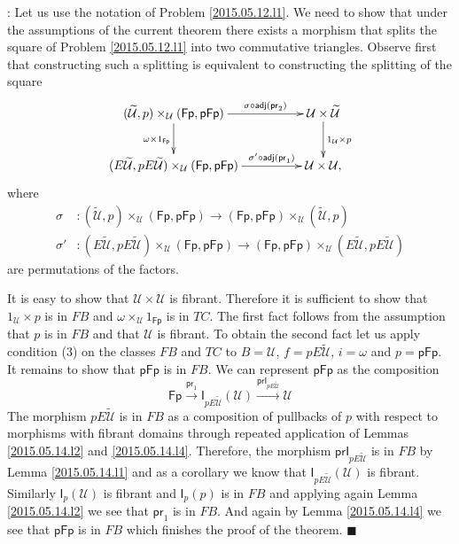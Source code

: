 \documentclass[12pt]{article}
\numberwithin{equation}{section}
\newenvironment{myproof}{{\bf Proof}:}{$\blacksquare$ \vskip 5mm }
\newcommand{\sr}{\rightarrow}
\newcommand{\wt}{\widetilde}
\newcommand{\id}{1}            %
\newcommand{\U}{\mathcal{U}}
\newcommand{\I}{\mathsf{I}}
\newcommand{\Fp}{\mathsf{Fp}}
\newcommand{\pFp}{\mathsf{pFp}}
\newcommand{\pr}{\mathsf{pr}}
\newcommand{\prI}{\mathsf{prI}}
\newcommand{\adj}{\mathsf{adj}}
\begin{document}
\begin{myproof}
Let us use the notation of Problem \ref{2015.05.12.l1}. We need to show that
under the assumptions of the current theorem there exists a morphism that
splits the square of Problem \ref{2015.05.12.l1} into two commutative
triangles. Observe first that constructing such a splitting is equivalent to
constructing the splitting of the square
%
$$
\begin{xy}
          \xymatrix@C=4pc{ (\wt{\U},p)\times_\U (\Fp,\pFp) \ar[r]^-{\sigma\circ
              \adj(\pr_2)} \ar[d]_{\omega \times \id_{\Fp}} & \U\times\wt{\U}
            \ar[d]^{\id_\U\times p}\\ (E\wt{\U},pE\wt{\U})\times_\U (\Fp,\pFp)
            \ar[r]^-{\sigma'\circ \adj(\pr_1)} & \U\times \U, }
\end{xy}
$$
%
where
%
\begin{align*}
  \sigma & :(\wt{\U},p)\times_\U (\Fp,\pFp)\sr (\Fp,\pFp)\times_\U (\wt{\U},p) \\
  \sigma'& :(E\wt{\U},pE\wt{\U})\times_\U (\Fp,\pFp) \sr (\Fp,\pFp) \times_\U (E\wt{\U},pE\wt{\U})
\end{align*}
%
are permutations of the factors.

It is easy to show that $\U\times \U$ is fibrant. Therefore it is sufficient to
show that $\id_\U\times p$ is in $FB$ and $\omega\times_\U \id_{\Fp}$ is in
$TC$. The first fact follows from the assumption that $p$ is in $FB$ and that
$\U$ is fibrant. To obtain the second fact let us apply condition (3) on the
classes $FB$ and $TC$ to $B=\U$, $f=pE\wt{\U}$, $i=\omega$ and $p=\pFp$.  It
remains to show that $\pFp$ is in $FB$. We can represent $\pFp$ as the
composition
%
$$\Fp\stackrel{\pr_1}{\sr} \I_{pE\wt{\U}}(\U) \stackrel{\prI_{pE\wt{\U}}}{\sr} \U$$
%
The morphism $pE\wt{\U}$ is in $FB$ as a composition of pullbacks of $p$ with
respect to morphisms with fibrant domains through repeated application of
Lemmas \ref{2015.05.14.l2} and \ref{2015.05.14.l4}. Therefore, the morphism
$\prI_{pE\wt{\U}}$ is in $FB$ by Lemma \ref{2015.05.14.l1} and as a corollary we
know that $\I_{pE\wt{\U}}(\U)$ is fibrant. Similarly $\I_p(\U)$ is fibrant and
$\I_p(p)$ is in $FB$ and applying again Lemma \ref{2015.05.14.l2} we see that
$\pr_1$ is in $FB$. And again by Lemma \ref{2015.05.14.l4} we see that $\pFp$ is
in $FB$ which finishes the proof of the theorem.
\end{myproof}
%
\end{document}
